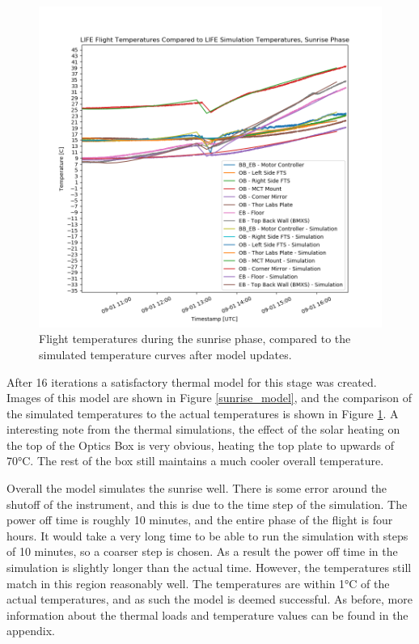 \begin{figure}
    \centering
    \includegraphics[width=\textwidth]{chap4_images/sunrise_images/sunrise_with_sim_temps.png}
    \caption{Flight temperatures during the sunrise phase, compared to the simulated temperature curves after model updates.}
    \label{fig:sunrise_temps_with_sims}
\end{figure}

After 16 iterations a satisfactory thermal model for this stage was created. Images of this model are shown in Figure \ref{sunrise_model}, and the comparison of the simulated temperatures to the actual temperatures is shown in Figure \ref{fig:sunrise_temps_with_sims}. A interesting note from the thermal simulations, the effect of the solar heating on the top of the Optics Box is very obvious, heating the top plate to upwards of 70°C. The rest of the box still maintains a much cooler overall temperature.

Overall the model simulates the sunrise well. There is some error around the shutoff of the instrument, and this is due to the time step of the simulation. The power off time is roughly 10 minutes, and the entire phase of the flight is four hours. It would take a very long time to be able to run the simulation with steps of 10 minutes, so a coarser step is chosen. As a result the power off time in the simulation is slightly longer than the actual time. However, the temperatures still match in this region reasonably well. The temperatures are within 1°C of the actual temperatures, and as such the model is deemed successful. As before, more information about the thermal loads and temperature values can be found in the appendix.

